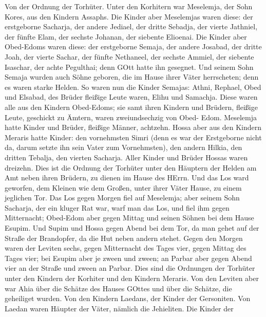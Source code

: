  Von der Ordnung der Torhüter. Unter den Korhitern war
Meselemja, der Sohn Kores, aus den Kindern Assaphs.  Die
Kinder aber Meselemjas waren diese: der erstgeborne Sacharja, der andere
Jediael, der dritte Sebadja, der vierte Jathniel,  der
fünfte Elam, der sechste Johanan, der siebente Elioenai. 
Die Kinder aber Obed-Edoms waren diese: der erstgeborne Semaja, der
andere Josabad, der dritte Joah, der vierte Sachar, der fünfte
Nethaneel,  der sechste Ammiel, der siebente Isaschar, der
achte Pegulthai; denn GOtt hatte ihn gesegnet.  Und seinem
Sohn Semaja wurden auch Söhne geboren, die im Hause ihrer Väter
herrscheten; denn es waren starke Helden.  So waren nun die
Kinder Semajas: Athni, Rephael, Obed und Elsabad, des Brüder fleißige
Leute waren, Elihu und Samachja.  Diese waren alle aus den
Kindern Obed-Edoms; sie samt ihren Kindern und Brüdern, fleißige Leute,
geschickt zu Ämtern, waren zweiundsechzig von Obed- Edom. 
Meselemja hatte Kinder und Brüder, fleißige Männer, achtzehn.
 Hossa aber aus den Kindern Meraris hatte Kinder: den
vornehmsten Simri (denn es war der Erstgeborne nicht da, darum setzte
ihn sein Vater zum Vornehmsten),  den andern Hilkia, den
dritten Tebalja, den vierten Sacharja. Aller Kinder und Brüder Hossas
waren dreizehn.  Dies ist die Ordnung der Torhüter unter
den Häuptern der Helden am Amt neben ihren Brüdern, zu dienen im Hause
des HErrn.  Und das Los ward geworfen, dem Kleinen wie dem
Großen, unter ihrer Väter Hause, zu einem jeglichen Tor. 
Das Los gegen Morgen fiel auf Meselemja; aber seinem Sohn Sacharja, der
ein kluger Rat war, warf man das Los, und fiel ihm gegen Mitternacht;
 Obed-Edom aber gegen Mittag und seinen Söhnen bei dem
Hause Esupim.  Und Supim und Hossa gegen Abend bei dem Tor,
da man gehet auf der Straße der Brandopfer, da die Hut neben andern
stehet.  Gegen den Morgen waren der Leviten sechs, gegen
Mitternacht des Tages vier, gegen Mittag des Tages vier; bei Esupim aber
je zween und zween;  an Parbar aber gegen Abend vier an der
Straße und zween an Parbar.  Dies sind die Ordnungen der
Torhüter unter den Kindern der Korhiter und den Kindern Meraris.
 Von den Leviten aber war Ahia über die Schätze des Hauses
GOttes und über die Schätze, die geheiliget wurden.  Von
den Kindern Laedans, der Kinder der Gersoniten. Von Laedan waren Häupter
der Väter, nämlich die Jehieliten.  Die Kinder der
